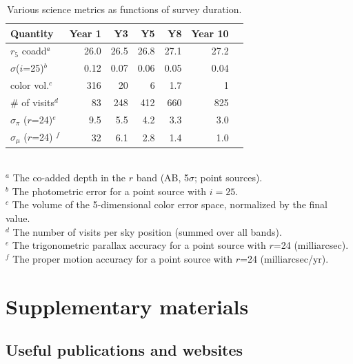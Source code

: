 \documentclass[DM,lsstdraft,toc,usenatbib]{lsstdoc}
\begin{document}
\begin{table}[h!]
\caption{Various science metrics as functions of survey duration.}
\begin{tabular}{|l|r|r|r|r|r|r|}
\hline     
          Quantity                          &     Year 1   &    Y3  &     Y5  &     Y8   &     Year 10   \\
\hline  
    $r_5$ coadd$^a$                   &       26.0    &      26.5   &      26.8    &      27.1    &          27.2     \\
    $\sigma$($i$=25)$^b$         &     0.12    &     0.07    &      0.06    &    0.05      &        0.04        \\     
    color vol.$^c$                        &       316     &       20     &        6      &    1.7        &           1       \\
     \# of visits$^d$                    &          83     &     248     &      412     &    660      &          825      \\  
    $\sigma_\pi$ ($r$=24)$^e$   &        9.5     &      5.5     &        4.2    &     3.3       &          3.0      \\ 
    $\sigma_\mu$ ($r$=24) $^f$  &  32   &      6.1    &     2.8   &     1.4   &     1.0     \\
\hline                         
\end{tabular}
\\ \vskip 0.05in
$^a$ The co-added depth in the $r$ band (AB, 5$\sigma$; point sources).  \\
$^b$ The photometric error for a point source with $i=25$. \\
$^c$ The volume of the 5-dimensional color error space, normalized by the final value. \\
$^d$ The number of visits per sky position (summed over all bands). \\
$^e$ The trigonometric parallax accuracy for a point source with $r$=24 (milliarcsec). \\ 
$^f$  The proper motion accuracy for a point source with $r$=24 (milliarcsec/yr).  \\
\end{table}


\newpage
\section{Supplementary materials \label{sec:supp}} 
\label{append:supplemental}

\subsection{Useful publications and websites \label{sec:pubs}}
\end{document}
